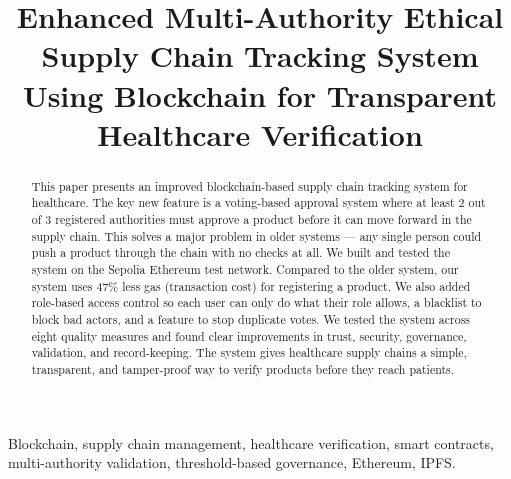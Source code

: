 \documentclass[conference]{IEEEtran}
\begin{document}
\title{Enhanced Multi-Authority Ethical Supply Chain Tracking System Using Blockchain for Transparent Healthcare Verification}

\author{
\and
{}
\and
{}
}

\maketitle

\begin{abstract}
This paper presents an improved blockchain-based supply chain tracking system for healthcare. The key new feature is a voting-based approval system where at least 2 out of 3 registered authorities must approve a product before it can move forward in the supply chain. This solves a major problem in older systems --- any single person could push a product through the chain with no checks at all. We built and tested the system on the Sepolia Ethereum test network. Compared to the older system, our system uses 47\% less gas (transaction cost) for registering a product. We also added role-based access control so each user can only do what their role allows, a blacklist to block bad actors, and a feature to stop duplicate votes. We tested the system across eight quality measures and found clear improvements in trust, security, governance, validation, and record-keeping. The system gives healthcare supply chains a simple, transparent, and tamper-proof way to verify products before they reach patients.
\end{abstract}

\begin{IEEEkeywords}
Blockchain, supply chain management, healthcare verification, smart contracts, multi-authority validation, threshold-based governance, Ethereum, IPFS.
\end{IEEEkeywords}
\end{document}
